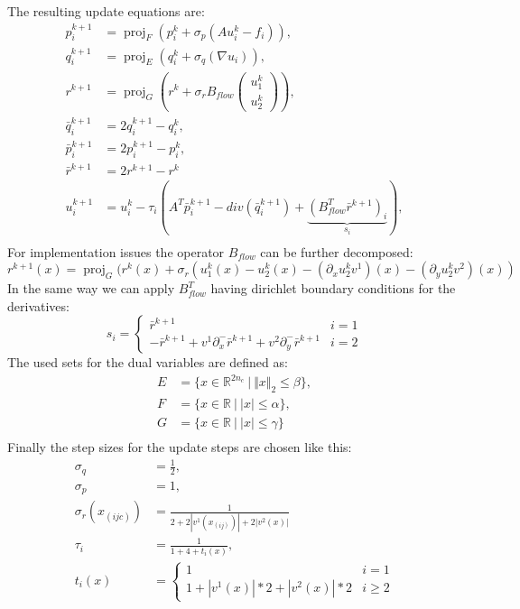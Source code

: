 \documentclass[A4,12pt]{article}
\DeclareMathOperator*{\proj}{proj}
\newcommand{\R}{\mathbb{R}}
\newcommand{\norm}[1]{\Vert #1 \Vert}
\begin{document}
The resulting update equations are:
\begin{equation}
\begin{aligned}
p_i^{k+1}&=\proj_F(p_i^k + \sigma_p (Au_i^k - f_i)), \\
q_i^{k+1}&=\proj_E(q_i^k + \sigma_q (\nabla u_i)), \\
r^{k+1}&=\proj_G\left(r^{k} + \sigma_r B_{flow}\begin{pmatrix}u_1^k \\ u_2^k\end{pmatrix}\right), \\
\bar q_i^{k+1} &= 2q_i^{k+1} - q_i^k,\\
\bar p_i^{k+1} &= 2p_i^{k+1} - p_i^k,\\
\bar r^{k+1} &= 2r^{k+1} - r^k\\
u_i^{k+1}&=u_i^k-\tau_i(A^T\bar p_i^{k+1}-div(\bar q_i^{k+1})+\underbrace{(B_{flow}^T\bar r^{k+1})_i}_{s_i}), \\
\end{aligned}
\end{equation}
For implementation issues the operator $B_{flow}$ can be further decomposed:
\begin{equation}
r^{k+1}(x) = \proj_G(r^{k}(x) + \sigma_r(u_1^k(x)-u_2^k(x)-(\partial_xu_2^kv^1)(x)-(\partial_yu_2^kv^2)(x))
\end{equation}
In the same way we can apply $B_{flow}^T$ having dirichlet boundary conditions for the derivatives:
\begin{equation}
s_i =
\begin{cases}
\bar r^{k+1} & i=1 \\
-\bar r^{k+1} + v^1\partial^-_x\bar r^{k+1} + v^2\partial^-_y \bar r^{k+1} & i=2
\end{cases}
\end{equation}
The used sets for the dual variables are defined as:
\begin{equation}
\begin{aligned}
E &= \{x \in \R^{2n_c} ~|~ \norm{x}_2 \leq \beta \}, \\
F &= \{x \in \R ~|~ |x| \leq \alpha \}, \\
G &= \{x \in \R ~|~ |x| \leq \gamma \} \\
\end{aligned}
\end{equation}
Finally the step sizes for the update steps are chosen like this:
\begin{equation}
\begin{aligned}
\sigma_q &= \frac{1}{2}, \\
\sigma_p &= 1, \\
\sigma_r (x_{(ijc)}) &= \frac{1}{2+2|v^1(x_{(ij)})|+2|v^2(x)|} \\
\tau_i&=\frac{1}{1+4+t_i(x)}, \\
t_i(x)&=\begin{cases} 1 & i=1 \\ 1+|v^1(x)|*2+|v^2(x)|*2 & i \geq 2 \end{cases}
\end{aligned}
\end{equation}
\end{document}
